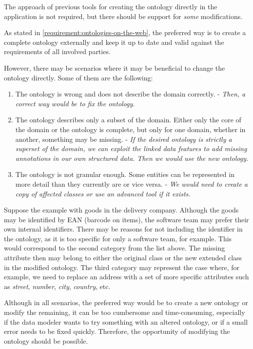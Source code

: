 \begin{requirement}
  \label{requirement:pim-editing}
  The approach of previous tools for creating the ontology directly in the application is not required, but there should be support for \textit{some} modifications.
\end{requirement}

As stated in \autoref{requirement:ontologies-on-the-web}, the preferred way is to create a complete ontology externally and keep it up to date and valid against the requirements of all involved parties.

However, there may be scenarios where it may be beneficial to change the ontology directly. Some of them are the following:

\begin{enumerate}
  \item The ontology is wrong and does not describe the domain correctly. - \textit{Then, a correct way would be to fix the ontology.}
  \item The ontology describes only a subset of the domain. Either only the core of the domain or the ontology is complete, but only for one domain, whether in another, something may be missing. - \textit{If the desired ontology is strictly a superset of the domain, we can exploit the linked data features to add missing annotations in our own structured data. Then we would use the new ontology.}
  \item The ontology is not granular enough. Some entities can be represented in more detail than they currently are or vice versa. - \textit{We would need to create a copy of affected classes or use an advanced tool if it exists.}
\end{enumerate}

Suppose the example with goods in the delivery company. Although the goods may be identified by EAN (barcode on items), the software team may prefer their own internal identifiers. There may be reasons for not including the identifier in the ontology, as it is too specific for only a software team, for example. This would correspond to the second category from the list above. The missing attribute then may belong to either the original class or the new extended class in the modified ontology. The third category may represent the case where, for example, we need to replace an address with a set of more specific attributes such as \textit{street}, \textit{number}, \textit{city}, \textit{country}, etc.

Although in all scenarios, the preferred way would be to create a new ontology or modify the remaining, it can be too cumbersome and time-consuming, especially if the data modeler wants to try something with an altered ontology, or if a small error needs to be fixed quickly. Therefore, the opportunity of modifying the ontology should be possible.

